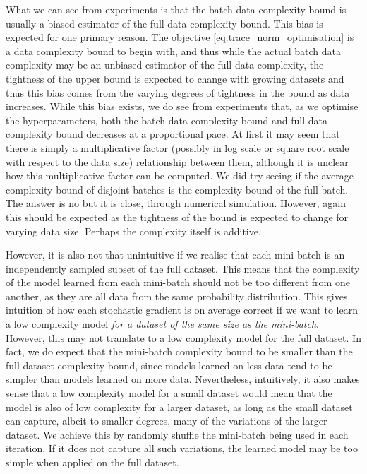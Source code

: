 \documentclass{article}
\begin{document}
		What we can see from experiments is that the batch data complexity bound is usually a biased estimator of the full data complexity bound. This bias is expected for one primary reason. The objective \eqref{eq:trace_norm_optimisation} is a data complexity bound to begin with, and thus while the actual batch data complexity may be an unbiased estimator of the full data complexity, the tightness of the upper bound is expected to change with growing datasets and thus this bias comes from the varying degrees of tightness in the bound as data increases. While this bias exists, we do see from experiments that, as we optimise the hyperparameters, both the batch data complexity bound and full data complexity bound decreases at a proportional pace. At first it may seem that there is simply a multiplicative factor (possibly in log scale or square root scale with respect to the data size) relationship between them, although it is unclear how this multiplicative factor can be computed. We did try seeing if the average complexity bound of disjoint batches is the complexity bound of the full batch. The answer is no but it is close, through numerical simulation. However, again this should be expected as the tightness of the bound is expected to change for varying data size. Perhaps the complexity itself is additive.
		
		However, it is also not that unintuitive if we realise that each mini-batch is an independently sampled subset of the full dataset. This means that the complexity of the model learned from each mini-batch should not be too different from one another, as they are all data from the same probability distribution. This gives intuition of how each stochastic gradient is on average correct if we want to learn a low complexity model \textit{for a dataset of the same size as the mini-batch}. However, this may not translate to a low complexity model for the full dataset. In fact, we do expect that the mini-batch complexity bound to be smaller than the full dataset complexity bound, since models learned on less data tend to be simpler than models learned on more data. Nevertheless, intuitively, it also makes sense that a low complexity model for a small dataset would mean that the model is also of low complexity for a larger dataset, as long as the small dataset can capture, albeit to smaller degrees, many of the variations of the larger dataset. We achieve this by randomly shuffle the mini-batch being used in each iteration. If it does not capture all such variations, the learned model may be too simple when applied on the full dataset.
		
\end{document}

